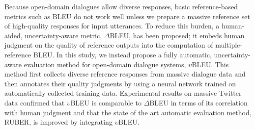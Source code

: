 Because open-domain dialogues allow diverse responses, basic reference-based metrics such as BLEU do not work well unless we prepare a massive reference set of high-quality responses for input utterances. To reduce this burden, a human-aided, uncertainty-aware metric, $\Delta$BLEU, has been proposed;  it embeds human judgment on the quality of reference outputs into the computation of multiple-reference BLEU. In this study, we instead propose a fully automatic, uncertainty-aware evaluation method for open-domain dialogue systems, $\upsilon$BLEU. This method first collects diverse reference responses from massive dialogue data and then annotates their quality judgments by using a neural network trained on automatically collected training data. Experimental results on massive Twitter data confirmed that $\upsilon$BLEU is comparable to $\Delta$BLEU in terms of its correlation with human judgment and that the state of the art automatic evaluation method, RUBER, is improved by integrating $\upsilon$BLEU.
